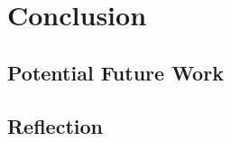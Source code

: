 \documentclass[11pt]{book}
\begin{document}
\chapter{Conclusion}


\section{Potential Future Work}

\section{Reflection}

\printbibliography
\end{document}
